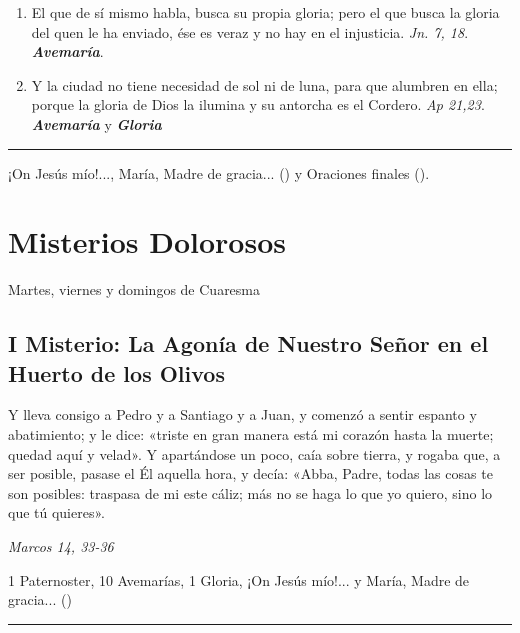 \documentclass[11pt,a4paper]{book}
\begin{document}
\begin{enumerate}
        \item El que de sí mismo habla, busca su propia gloria; pero el que busca la gloria del quen le ha enviado, ése es veraz y no hay en el injusticia.
             \emph{Jn. 7, 18}. \textbf{\emph{Avemaría}}.

        \item Y la ciudad no tiene necesidad de sol ni de luna, para que alumbren en ella; porque la gloria de Dios la ilumina y su antorcha es el Cordero. 
            \emph{Ap 21,23}. \textbf{\emph{Avemaría}} y \textbf{\emph{Gloria}}
    \end{enumerate}    

    \rule{\textwidth}{0.5pt}

    ¡On Jesús mío!..., María, Madre de gracia... () y Oraciones finales ().

    \newpage    

    \section*{Misterios Dolorosos}
    Martes, viernes y domingos de Cuaresma

    \subsection*{I Misterio: La Agonía de Nuestro Señor en el Huerto de los Olivos}
    
    Y lleva consigo a Pedro y a Santiago y a Juan, y comenzó a sentir espanto y abatimiento; y le dice: 
    «triste en gran manera está mi corazón hasta la muerte; quedad aquí y velad». Y apartándose un poco, 
    caía sobre tierra, y rogaba que, a ser posible, pasase el Él aquella hora, y decía: «Abba, Padre, todas las cosas te son posibles: 
    traspasa de mi este cáliz; más no se haga lo que yo quiero, sino lo que tú quieres».
    
    \begin{flushright}
        \emph{Marcos 14, 33-36}
    \end{flushright}
    
    1 Paternoster, 10 Avemarías, 1 Gloria, ¡On Jesús mío!... y María, Madre de gracia... ()

    \rule{\textwidth}{0.5pt}
\end{document}
